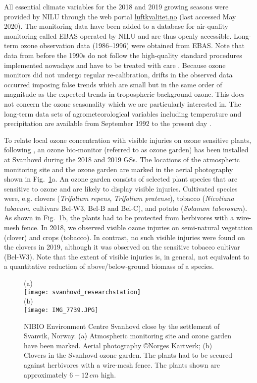 \documentclass[bg, manuscript]{copernicus}
\begin{document}
All essential climate variables for the 2018 and 2019 growing seasons were provided by NILU through the web portal \href{luftkvalitet.no}{luftkvalitet.no} (last accessed May 2020). The  monitoring data have been added to a database for air-quality monitoring called EBAS operated by NILU and are thus openly accessible. Long-term ozone observation data (1986--1996) were obtained from EBAS. Note that data from before the 1990s do not follow the high-quality standard procedures implemented nowadays and have to be treated with care \citep{NILU2003}. Because ozone monitors did not undergo regular re-calibration, drifts in the observed data occurred imposing false trends which are small but in the same order of magnitude as the expected trends in tropospheric background ozone. This does not concern the ozone seasonality which we are particularly interested in.
The long-term data sets of agrometeorological variables including temperature and precipitation are available from September 1992 to the present day \citep[LandbruksMeteorologiske Tjeneste][note the station name here is Pasvik]{LMT_NIBIO}.

To relate local ozone concentration \chem{[O_3]} with visible injuries on ozone sensitive plants, following \citet{GCB:Mills2011}, an ozone bio-monitor (referred to as ozone garden) has been installed at Svanhovd during the 2018 and 2019 GSs. The locations of the atmospheric monitoring site and the ozone garden are marked in the aerial photography shown in Fig.~\ref{fig:svanhovd_research_station}a. An ozone garden consists of selected plant species that are sensitive to ozone and are likely to display visible injuries. Cultivated species were, e.g. clovers (\emph{Trifolium repens}, \emph{Trifolium pratense}), tobacco (\emph{Nicotiana tabacum}, cultivars Bel-W3, Bel-B and Bel-C), and potato (\emph{Solanum tuberosum}). As shown in Fig.~\ref{fig:svanhovd_research_station}b, the plants had to be protected from herbivores with a wire-mesh fence. In 2018, we observed visible ozone injuries on semi-natural vegetation (clover) and crops (tobacco). In contrast, no such visible injuries were found on the clovers in 2019, although it was observed on the sensitive tobacco cultivar (Bel-W3). Note that the extent of visible injuries is, in general, not equivalent to a quantitative reduction of above/below-ground biomass of a species.

\begin{figure}[t]
  \centering
  (a)\\
  \texttt{[image: svanhovd\_researchstation]}\\
  (b)\\
  \texttt{[image: IMG\_7739.JPG]}
  \caption{NIBIO Environment Centre Svanhovd close by the settlement of Svanvik, Norway. (a) Atmospheric monitoring site and ozone garden have been marked. Aerial photography \copyright Norges Kartverk; (b) Clovers in the Svanhovd ozone garden. The plants had to be secured against herbivores with a wire-mesh fence. The plants shown are approximately $6-12\,\unit{cm}$ high.}
  \label{fig:svanhovd_research_station}
\end{figure}
\end{document}
